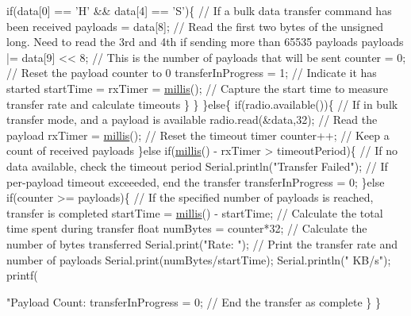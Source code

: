 \begin{DoxyCodeInclude}
        \textcolor{keywordflow}{if}(data[0] == \textcolor{charliteral}{'H'} && data[4] == \textcolor{charliteral}{'S'})\{    \textcolor{comment}{// If a bulk data transfer command has been received}
          payloads = data[8];                    \textcolor{comment}{// Read the first two bytes of the unsigned long. Need to
       read the 3rd and 4th if sending more than 65535 payloads}
          payloads |= data[9] << 8;              \textcolor{comment}{// This is the number of payloads that will be sent}
          counter = 0;                           \textcolor{comment}{// Reset the payload counter to 0}
          transferInProgress = 1;                \textcolor{comment}{// Indicate it has started}
          startTime = rxTimer = \hyperlink{group__Porting__General_gad5b3ec1ce839fa1c4337a7d0312e9749}{millis}();        \textcolor{comment}{// Capture the start time to measure transfer rate
       and calculate timeouts}
        \}
     \}
  \}\textcolor{keywordflow}{else}\{
     \textcolor{keywordflow}{if}(radio.available())\{                     \textcolor{comment}{// If in bulk transfer mode, and a payload is available}
       radio.read(&data,32);                    \textcolor{comment}{// Read the payload}
       rxTimer = \hyperlink{group__Porting__General_gad5b3ec1ce839fa1c4337a7d0312e9749}{millis}();                      \textcolor{comment}{// Reset the timeout timer}
       counter++;                               \textcolor{comment}{// Keep a count of received payloads}
     \}\textcolor{keywordflow}{else}
     \textcolor{keywordflow}{if}(\hyperlink{group__Porting__General_gad5b3ec1ce839fa1c4337a7d0312e9749}{millis}() - rxTimer > timeoutPeriod)\{    \textcolor{comment}{// If no data available, check the timeout period}
       Serial.println(\textcolor{stringliteral}{"Transfer Failed"});       \textcolor{comment}{// If per-payload timeout exceeeded, end the transfer}
       transferInProgress = 0; 
     \}\textcolor{keywordflow}{else}
     \textcolor{keywordflow}{if}(counter >= payloads)\{                   \textcolor{comment}{// If the specified number of payloads is reached, transfer
       is completed}
      startTime = \hyperlink{group__Porting__General_gad5b3ec1ce839fa1c4337a7d0312e9749}{millis}() - startTime;         \textcolor{comment}{// Calculate the total time spent during transfer}
      \textcolor{keywordtype}{float} numBytes = counter*32;              \textcolor{comment}{// Calculate the number of bytes transferred}
      Serial.print(\textcolor{stringliteral}{"Rate: "});                   \textcolor{comment}{// Print the transfer rate and number of payloads}
      Serial.print(numBytes/startTime);
      Serial.println(\textcolor{stringliteral}{" KB/s"});
      printf(\textcolor{stringliteral}{"Payload Count: %
      transferInProgress = 0;                   \textcolor{comment}{// End the transfer as complete}
    \}     
  \}
  
}
\end{DoxyCodeInclude}
